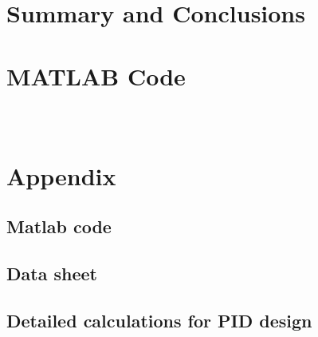 \documentclass[11pt]{article}
\begin{document}

\section*{Summary and Conclusions}


\appendix

\section{MATLAB Code}
\label{app:code}

\begin{lstlisting}
\end{lstlisting}

\begin{lstlisting}
\end{lstlisting}

\begin{lstlisting}
\end{lstlisting}

\appendix
\section{Appendix}
\subsection{Matlab code}
\subsection{Data sheet}
\subsection{Detailed calculations for PID design}

\label{LastPage}
\end{document}

